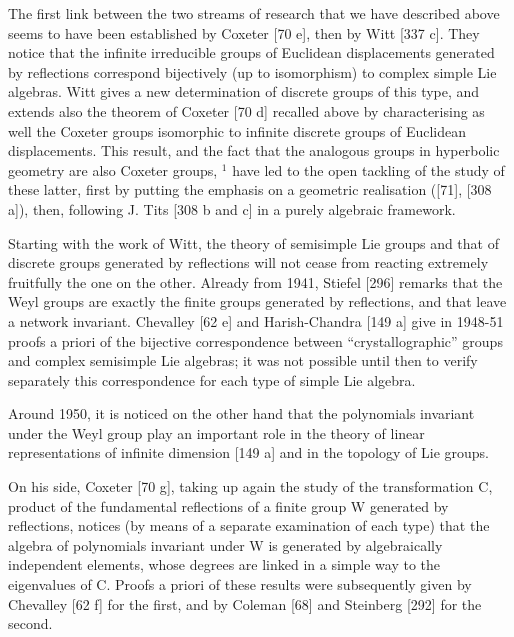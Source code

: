 The first link between the two streams of research that we have described above seems to have been established by Coxeter {[}70 e{]}, then by Witt {[}337 c{]}. They notice that the infinite irreducible groups of Euclidean displacements generated by reflections correspond bijectively (up to isomorphism) to complex simple Lie algebras. Witt gives a new determination of discrete groups of this type, and extends also the theorem of Coxeter {[}70 d{]} recalled above by characterising as well the Coxeter groups isomorphic to infinite discrete groups of Euclidean displacements. This result, and the fact that the analogous groups in hyperbolic geometry are also Coxeter groups, \(^{1}\) have led to the open tackling of the study of these latter, first by putting the emphasis on a geometric realisation ({[}71{]}, {[}308 a{]}), then, following J. Tits {[}308 b and c{]} in a purely algebraic framework.

Starting with the work of Witt, the theory of semisimple Lie groups and that of discrete groups generated by reflections will not cease from reacting extremely fruitfully the one on the other. Already from 1941, Stiefel {[}296{]} remarks that the Weyl groups are exactly the finite groups generated by reflections, and that leave a network invariant. Chevalley {[}62 e{]} and Harish-Chandra {[}149 a{]} give in 1948-51 proofs a priori of the bijective correspondence between ``crystallographic'' groups and complex semisimple Lie algebras; it was not possible until then to verify separately this correspondence for each type of simple Lie algebra.

Around 1950, it is noticed on the other hand that the polynomials invariant under the Weyl group play an important role in the theory of linear representations of infinite dimension {[}149 a{]} and in the topology of Lie groups.

On his side, Coxeter {[}70 g{]}, taking up again the study of the transformation C, product of the fundamental reflections of a finite group W generated by reflections, notices (by means of a separate examination of each type) that the algebra of polynomials invariant under W is generated by algebraically independent elements, whose degrees are linked in a simple way to the eigenvalues of C. Proofs a priori of these results were subsequently given by Chevalley {[}62 f{]} for the first, and by Coleman {[}68{]} and Steinberg {[}292{]} for the second.


